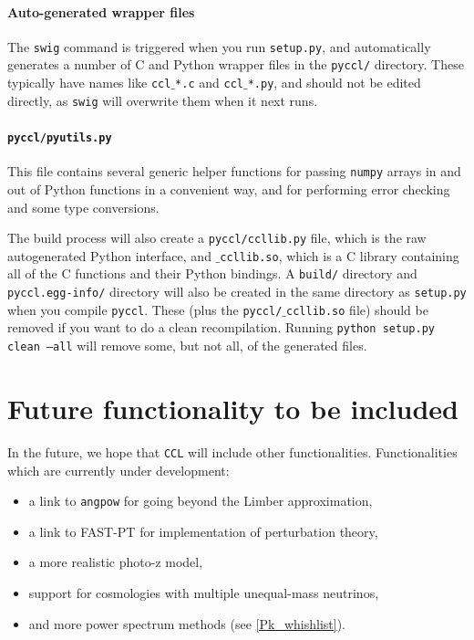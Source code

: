 \documentclass[\docopts]{\docclass}
\begin{document}
\paragraph{Auto-generated wrapper files} The {\tt swig} command is triggered when you run {\tt setup.py}, and automatically generates a number of C and Python wrapper files in the {\tt pyccl/} directory. These typically have names like {\tt ccl$\_$*.c} and {\tt ccl$\_$*.py}, and should not be edited directly, as {\tt swig} will overwrite them when it next runs.

\paragraph{{\tt pyccl/pyutils.py}} This file contains several generic helper functions for passing {\tt numpy} arrays in and out of Python functions in a convenient way, and for performing error checking and some type conversions.

The build process will also create a {\tt pyccl/ccllib.py} file, which is the raw autogenerated Python interface, and {\tt $\_$ccllib.so}, which is a C library containing all of the C functions and their Python bindings. A {\tt build/} directory and {\tt pyccl.egg-info/} directory will also be created in the same directory as {\tt setup.py} when you compile {\tt pyccl}. These (plus the {\tt pyccl/$\_$ccllib.so} file) should be removed if you want to do a clean recompilation. Running {\tt python setup.py clean --all} will remove some, but not all, of the generated files.


\section{Future functionality to be included}
\label{sec:future}

In the future, we hope that {\tt CCL} will include other functionalities. Functionalities which are currently under development:
\begin{itemize}
        \item a link to {\tt angpow} \citep{2017arXiv170103592C} for going beyond the Limber approximation,
	\item a link to FAST-PT \citep{FASTPT} for implementation of perturbation theory,
	\item a more realistic photo-z model,
	\item support for cosmologies with multiple unequal-mass neutrinos,
	\item and more power spectrum methods (see \ref{Pk_whishlist}).
\end{itemize}
\end{document}
